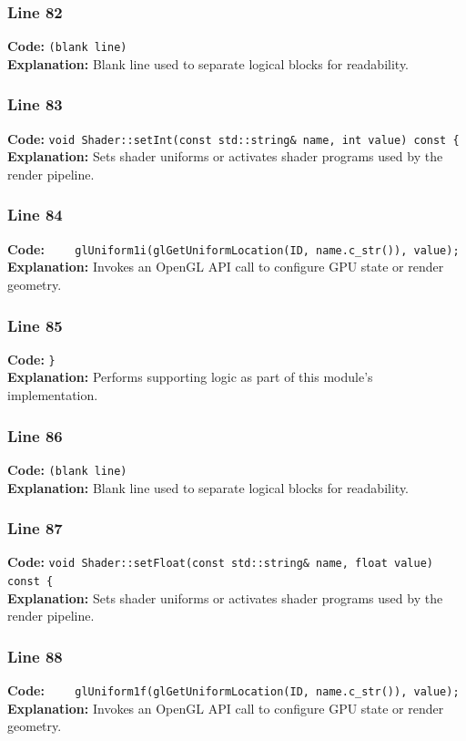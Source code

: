 \documentclass[11pt,a4paper]{article}
\begin{document}
\subsubsection*{Line 82}
\textbf{Code:} \texttt{(blank line)}\\
\textbf{Explanation:} Blank line used to separate logical blocks for readability.

\subsubsection*{Line 83}
\textbf{Code:} \verb|void Shader::setInt(const std::string& name, int value) const {|\\
\textbf{Explanation:} Sets shader uniforms or activates shader programs used by the render pipeline.

\subsubsection*{Line 84}
\textbf{Code:} \verb|    glUniform1i(glGetUniformLocation(ID, name.c_str()), value);|\\
\textbf{Explanation:} Invokes an OpenGL API call to configure GPU state or render geometry.

\subsubsection*{Line 85}
\textbf{Code:} \verb|}|\\
\textbf{Explanation:} Performs supporting logic as part of this module's implementation.

\subsubsection*{Line 86}
\textbf{Code:} \texttt{(blank line)}\\
\textbf{Explanation:} Blank line used to separate logical blocks for readability.

\subsubsection*{Line 87}
\textbf{Code:} \verb|void Shader::setFloat(const std::string& name, float value) const {|\\
\textbf{Explanation:} Sets shader uniforms or activates shader programs used by the render pipeline.

\subsubsection*{Line 88}
\textbf{Code:} \verb|    glUniform1f(glGetUniformLocation(ID, name.c_str()), value);|\\
\textbf{Explanation:} Invokes an OpenGL API call to configure GPU state or render geometry.
\end{document}
